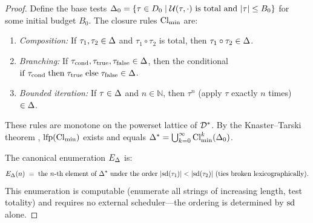 \begin{proof}
Define the base tests $\Delta_0 = \{\tau \in D_0 \mid
\mathcal{U}(\tau, \cdot) \text{ is total and } |\tau| \leq B_0\}$ for some
initial budget $B_0$.  The closure rules $\mathrm{Cl}_{\min}$ are:
\begin{enumerate}[nosep, label=(C\arabic*)]
  \item \emph{Composition:} If $\tau_1, \tau_2 \in \Delta$ and
        $\tau_1 \circ \tau_2$ is total, then $\tau_1 \circ \tau_2 \in \Delta$.
  \item \emph{Branching:} If $\tau_{\mathrm{cond}}, \tau_{\mathrm{true}},
        \tau_{\mathrm{false}} \in \Delta$, then the conditional
        $\mathrm{if}\;\tau_{\mathrm{cond}}\;\mathrm{then}\;\tau_{\mathrm{true}}
        \;\mathrm{else}\;\tau_{\mathrm{false}} \in \Delta$.
  \item \emph{Bounded iteration:} If $\tau \in \Delta$ and $n \in \mathbb{N}$,
        then $\tau^n$ (apply $\tau$ exactly $n$ times) $\in \Delta$.
\end{enumerate}
These rules are monotone on the powerset lattice of $\mathcal{D}^*$.  By the
Knaster--Tarski theorem \citep{tarski1955}, $\mathrm{lfp}(\mathrm{Cl}_{\min})$ exists and equals
$\Delta^* = \bigcup_{k=0}^{\infty} \mathrm{Cl}_{\min}^k(\Delta_0)$.

The canonical enumeration $E_\Delta$ is:
\[
  E_\Delta(n) \;=\; \text{the $n$-th element of } \Delta^*
    \text{ under the order } |\mathrm{sd}(\tau_1)| < |\mathrm{sd}(\tau_2)|
    \text{ (ties broken lexicographically)}.
\]
This enumeration is computable (enumerate all strings of increasing length,
test totality) and requires no external scheduler---the ordering is
determined by $\mathrm{sd}$ alone.

\end{proof}

